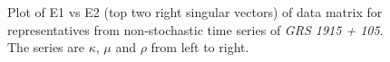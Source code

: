 \documentclass[10pt,conference]{IEEEtran}
\begin{document}
\begin{figure}
   \centering
   \caption{Plot of E1 vs E2 (top two right singular vectors) of data matrix for  representatives from non-stochastic time series of \textit{GRS 1915 + 105}. The series are $\kappa$, $\mu$ and $\rho$ from left to right.}
   \label{svd_e1e2_nonstochastic}
\end{figure}

\end{document}
